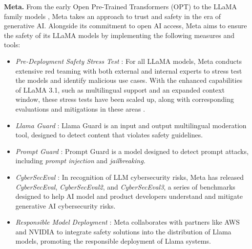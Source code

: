 \textbf{Meta.}
From the early Open Pre-Trained Transformers (OPT) \cite{zhang2022opt} to the LLaMA family models \cite{touvron2023llama, touvron2023llama2, dubey2024llama}, Meta takes an approach to trust and safety in the era of generative AI. Alongside its commitment to open AI access, Meta aims to ensure the safety of its LLaMA models by implementing the following measures and tools:

\begin{itemize}[nolistsep, leftmargin=*]
   \item[] \textcolor[HTML]{0d65ef}{\largedot} {\textit{Pre-Deployment Safety Stress Test}} \cite{llama_responsibiliy}: For all LLaMA models, Meta conducts extensive red teaming with both external and internal experts to stress test the models and identify malicious use cases. With the enhanced capabilities of LLaMA 3.1, such as multilingual support and an expanded context window, these stress tests have been scaled up, along with corresponding evaluations and mitigations in these areas \cite{dubey2024llama}. 
    \item[] \textcolor[HTML]{0d65ef}{\largedot} {\textit{Llama Guard}} \cite{inan2023llama}: Llama Guard is an input and output multilingual moderation tool, designed to detect content that violates safety guidelines.
    \item[] \textcolor[HTML]{0d65ef}{\largedot} {\textit{Prompt Guard}} \cite{llama_prompt_guard}: Prompt Guard is a model designed to detect prompt attacks, including \textit{prompt injection} and \textit{jailbreaking}.
    \item[] \textcolor[HTML]{0d65ef}{\largedot} {\textit{CyberSecEval}} \cite{bhatt2023purple, bhatt2024cyberseceval, wan2024cyberseceval}: In recognition of LLM cybersecurity risks, Meta has released \textit{CyberSecEval}, \textit{CyberSecEval2}, and \textit{CyberSecEval3}, a series of benchmarks designed to help AI model and product developers understand and mitigate generative AI cybersecurity risks.
    \item[] \textcolor[HTML]{0d65ef}{\largedot} {\textit{Responsible Model Deployment}} \cite{llama_responsibiliy}: Meta collaborates with partners like AWS and NVIDIA to integrate safety solutions into the distribution of Llama models, promoting the responsible deployment of Llama systems.
\end{itemize}

